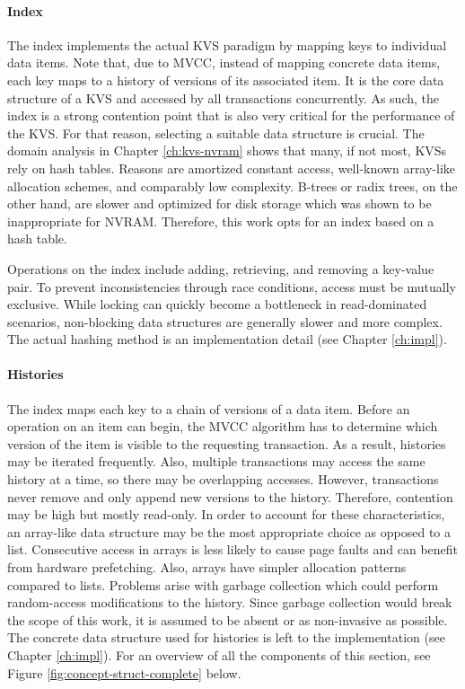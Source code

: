 \paragraph{Index}

The index implements the actual \ac{KVS} paradigm by mapping keys to individual
data items. Note that, due to \ac{MVCC}, instead of mapping concrete data items,
each key maps to a history of versions of its associated item. It is the core
data structure of a \ac{KVS} and accessed by all transactions concurrently. As
such, the index is a strong contention point that is also very critical for the
performance of the \ac{KVS}. For that reason, selecting a suitable data
structure is crucial. The domain analysis in Chapter \ref{ch:kvs-nvram} shows
that many, if not most, \acp{KVS} rely on hash tables. Reasons are amortized
constant access, well-known array-like allocation schemes, and comparably low
complexity. B-trees or radix trees, on the other hand, are slower and optimized
for disk storage which was shown to be inappropriate for \ac{NVRAM}. Therefore,
this work opts for an index based on a hash table.

Operations on the index include adding, retrieving, and removing a key-value
pair. To prevent inconsistencies through race conditions, access must be
mutually exclusive. While locking can quickly become a bottleneck in
read-dominated scenarios, non-blocking data structures are generally slower and
more complex. The actual hashing method is an implementation detail (see Chapter \ref{ch:impl}).

\paragraph{Histories}

The index maps each key to a chain of versions of a data item. Before an
operation on an item can begin, the \ac{MVCC} algorithm has to determine which
version of the item is visible to the requesting transaction. As a result,
histories may be iterated frequently. Also, multiple transactions may access the
same history at a time, so there may be overlapping accesses. However,
transactions never remove and only append new versions to the history.
Therefore, contention may be high but mostly read-only. In order to account for
these characteristics, an array-like data structure may be the most appropriate
choice as opposed to a list. Consecutive access in arrays is less likely to
cause page faults and can benefit from hardware prefetching. Also, arrays have
simpler allocation patterns compared to lists. Problems arise with garbage
collection which could perform random-access modifications to the history. Since
garbage collection would break the scope of this work, it is assumed to be
absent or as non-invasive as possible. The concrete data structure used for
histories is left to the implementation (see Chapter \ref{ch:impl}). For an
overview of all the components of this section, see Figure
\ref{fig:concept-struct-complete} below.

